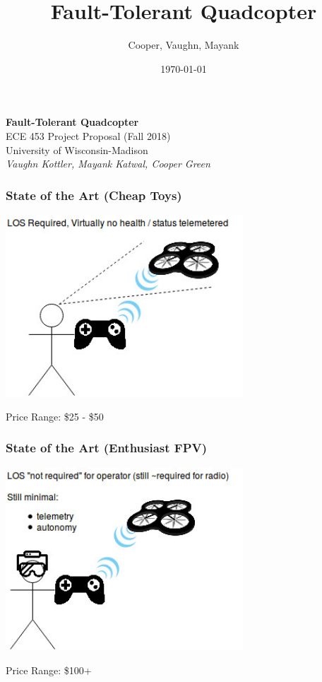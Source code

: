 \documentclass{beamer}
\title{Fault-Tolerant Quadcopter}
\author{Cooper, Vaughn, Mayank}
\date{\today}
\begin{document}
{
\begin{frame}
\begin{center}
{\Large\textbf{Fault-Tolerant Quadcopter}}\\
\vspace{\baselineskip}
ECE 453 Project Proposal (Fall 2018)\\
University of Wisconsin-Madison\\
\vspace{\baselineskip}
{\large\textit{Vaughn Kottler, Mayank Katwal, Cooper Green}}
\end{center}
\end{frame}
}

\begin{frame}
\frametitle{State of the Art (Cheap Toys)}
\begin{center}
\includegraphics[width=3.5in]{../src/im/crude}

Price Range: \$25 - \$50
\end{center}
\end{frame}

\begin{frame}
\frametitle{State of the Art (Enthusiast FPV)}
\begin{center}
\includegraphics[width=3.5in]{../src/im/fpv}

Price Range: \$100+
\end{center}
\end{frame}
\end{document}
